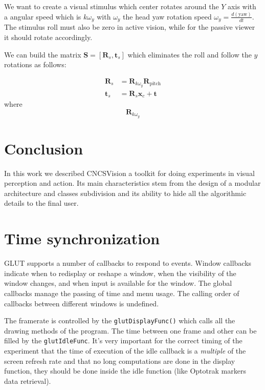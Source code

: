 \documentclass[acmtocl,acmnow]{acmtrans2m}
\begin{document}
We want to create a visual stimulus which center rotates around the $Y$ axis with a angular speed which is $k \omega_y$ with $\omega_y$ the 
head yaw rotation speed $\omega_y = \frac{d (\textrm{yaw})}{dt}$. 
The stimulus roll must also be zero in active vision, while for the passive viewer it should rotate accordingly.

We can build the matrix $\mathbf{S}=[ \mathbf{R}_s, \mathbf{t}_s]$ which eliminates the roll and follow the $y$ rotations as follows:

\begin{eqnarray*}
 \mathbf{R}_s &= \mathbf{R}_{k \omega_y } \mathbf{R}_{\textrm{pitch}} \\
 \mathbf{t}_s &= \mathbf{R}_s \mathbf{x}_c + \mathbf{t}
\end{eqnarray*}
where 
\begin{equation}
 \mathbf{R}_{k \omega_y }
\end{equation}

\section{Conclusion}
In this work we described CNCSVision a toolkit for doing experiments in visual perception and action.
Its main characteristics stem from the design of a modular architecture and classes subdivision and its ability to hide all the algorithmic details to the 
final user.

\appendix
\section{Time synchronization}
GLUT supports a number of callbacks to respond to events. Window callbacks indicate when to redisplay or reshape a window, when the visibility of the window changes, and when input is available for the window. 
The global callbacks manage the passing of time and menu usage. The calling order of callbacks between different windows is undefined.

The framerate is controlled by the \texttt{glutDisplayFunc()} which calls all the drawing methods of the program. The time between one frame and other can be filled by the \texttt{glutIdleFunc}.
It's very important for the correct timing of the experiment that the time of execution of the idle callback is a \emph{multiple} of the screen refresh rate and that no long computations are done in the 
display function, they should be done inside the idle function (like Optotrak markers data retrieval). 
\end{document}
